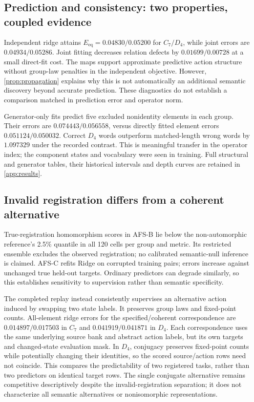 \documentclass{article}
\newcommand{\Eeq}{E_{\mathrm{eq}}}
\begin{document}
\subsection{Prediction and consistency: two properties, coupled evidence}
Independent ridge attains $\Eeq=0.04830/0.05200$ for $C_7/D_4$, while joint errors are $0.04934/0.05286$. Joint fitting decreases relation defects by $0.01699/0.00728$ at a small direct-fit cost. The maps support approximate predictive action structure without group-law penalties in the independent objective. However, \cref{prop:propagation} explains why this is not automatically an additional semantic discovery beyond accurate prediction. These diagnostics do not establish a comparison matched in prediction error and operator norm.

Generator-only fits predict five excluded nonidentity elements in each group. Their errors are $0.074443/0.056558$, versus directly fitted element errors $0.051124/0.050032$. Correct $D_4$ words outperform matched-length wrong words by $1.097329$ under the recorded contrast. This is meaningful transfer in the operator index; the component states and vocabulary were seen in training. Full structural and generator tables, their historical intervals and depth curves are retained in \cref{app:results}.

\subsection{Invalid registration differs from a coherent alternative}
True-registration homomorphism scores in AFS-B lie below the non-automorphic reference's 2.5\% quantile in all 120 cells per group and metric. Its restricted ensemble excludes the observed registration; no calibrated semantic-null inference is claimed. AFS-C refits Ridge on corrupted training pairs; errors increase against unchanged true held-out targets. Ordinary predictors can degrade similarly, so this establishes sensitivity to supervision rather than semantic specificity.

The completed replay instead consistently supervises an alternative action induced by swapping two state labels. It preserves group laws and fixed-point counts. All-element ridge errors for the specified/coherent correspondence are $0.014897/0.017503$ in $C_7$ and $0.041919/0.041871$ in $D_4$. Each correspondence uses the same underlying source bank and abstract action labels, but its own targets and changed-state evaluation mask. In $D_4$, conjugacy preserves fixed-point counts while potentially changing their identities, so the scored source/action rows need not coincide. This compares the predictability of two registered tasks, rather than two predictors on identical target rows. The single conjugate alternative remains competitive descriptively despite the invalid-registration separation; it does not characterize all semantic alternatives or nonisomorphic representations.
\end{document}
